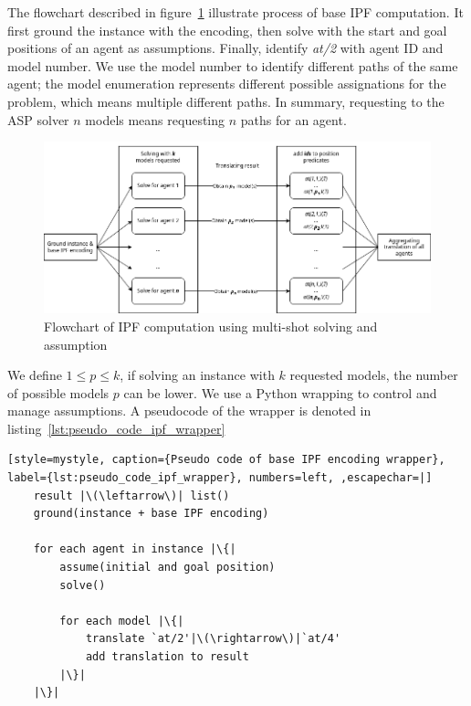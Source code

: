 The flowchart described in figure~\ref{fig:flowchart_ipf_computation} illustrate process of base IPF computation. It first ground the instance with the encoding, then solve with the start and goal positions of an agent as assumptions. Finally, identify \textit{at/2} with agent ID and model number. We use the model number to identify different paths of the same agent; the model enumeration represents different possible assignations for the problem, which means multiple different paths. In summary, requesting to the ASP solver \(n\) models means requesting \(n\) paths for an agent.

\begin{figure}[H]
    \centering
    \caption{Flowchart of IPF computation using multi-shot solving and assumption}\label{fig:flowchart_ipf_computation}
    \includegraphics[width=\widthimg]{img/flowchart_ipf_computation.drawio.png}
\end{figure}


We define \(1 \leq p \leq k\), if solving an instance with \(k\) requested models, the number of possible models \(p\) can be lower. 
We use a Python wrapping to control and manage assumptions. A pseudocode of the wrapper is denoted in listing~\ref{lst:pseudo_code_ipf_wrapper}

\begin{minipage}[H]{\linewidth}
\begin{lstlisting}[style=mystyle, caption={Pseudo code of base IPF encoding wrapper}, label={lst:pseudo_code_ipf_wrapper}, numbers=left, ,escapechar=|]
    result |\(\leftarrow\)| list()
    ground(instance + base IPF encoding)

    for each agent in instance |\{|
        assume(initial and goal position)
        solve()

        for each model |\{|
            translate `at/2'|\(\rightarrow\)|`at/4'
            add translation to result
        |\}|
    |\}|  
\end{lstlisting}
\end{minipage}

